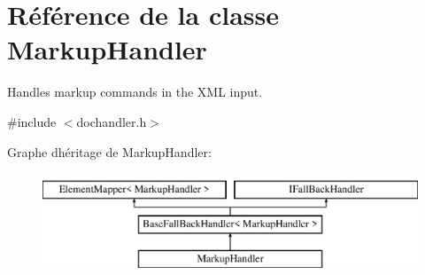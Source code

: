 \hypertarget{class_markup_handler}{}\section{Référence de la classe Markup\+Handler}
\label{class_markup_handler}


Handles markup commands in the X\+M\+L input.  




{\ttfamily \#include $<$dochandler.\+h$>$}

Graphe d\textquotesingle{}héritage de Markup\+Handler\+:\begin{figure}[H]
\begin{center}
\leavevmode
\includegraphics[height=3.000000cm]{class_markup_handler}
\end{center}
\end{figure}
